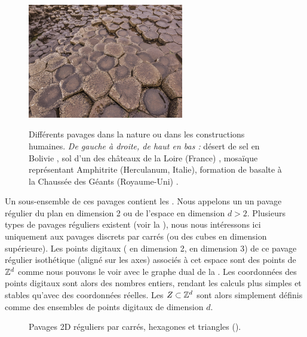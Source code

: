 \begin{figure}[ht]
\begin{center}
    \includegraphics[width=6.8cm]{images/Notions/pavage_chaussee_des_geants}\\
    \caption[Différents pavages dans la nature ou dans les constructions humaines]
    {Différents pavages dans la nature ou dans les constructions humaines.
    \emph{De gauche à droite, de haut en bas :} désert de sel en Bolivie
    \cite{pavage1}, sol d'un des châteaux de la Loire (France) \cite{pavage2},
    mosaïque représentant Amphitrite (Herculanum, Italie), formation de basalte à la Chaussée des
    Géants (Royaume-Uni) \cite{pavage4}.\label{fig:pavage-exemple}}
  \end{center}
\end{figure}

Un sous-ensemble de ces pavages contient les . Nous
appelons un  un pavage régulier du plan en dimension 2
ou de l'espace en dimension $d > 2$. Plusieurs types de pavages réguliers
existent (voir la ), nous nous intéressons ici uniquement
aux pavages discrets par carrés (ou des cubes en dimension supérieure). Les
points digitaux ( en dimension 2,  en
dimension 3) de ce pavage régulier isothétique (aligné sur les axes)  associés à
cet espace sont des points de $\mathbb{Z}^d$ comme nous pouvons le voir avec le graphe
dual de la . Les coordonnées des points digitaux sont
alors des nombres entiers, rendant les calculs plus simples et stables qu'avec
des coordonnées réelles. Les  $Z \subset \mathbb{Z}^d$
sont alors simplement définis comme des ensembles de points digitaux de
dimension $d$.

\begin{figure}[ht]
  \begin{center}
    
    \caption{Pavages 2D réguliers par carrés, hexagones et triangles ().\label{fig:pavages}}
  \end{center}
\end{figure}

